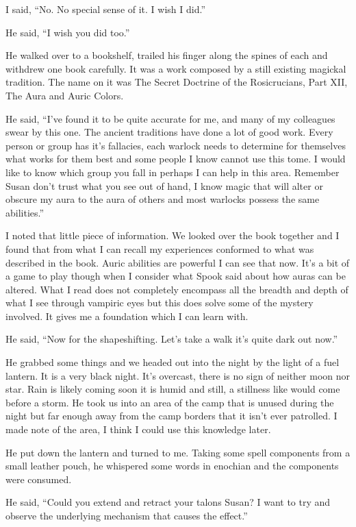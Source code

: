 I said, ``No. No special sense of it. I wish I did.''

He said, ``I wish you did too.''

He walked over to a bookshelf, trailed his finger along the spines of each and withdrew one book carefully. It was a work composed by a still existing magickal tradition. The name on it was The Secret Doctrine of the Rosicrucians, Part XII, The Aura and Auric Colors.

He said, ``I've found it to be quite accurate for me, and many of my colleagues swear by this one. The ancient traditions have done a lot of good work. Every person or group has it's fallacies, each warlock needs to determine for themselves what works for them best and some people I know cannot use this tome. I would like to know which group you fall in perhaps I can help in this area. Remember Susan don't trust what you see out of hand, I know magic that will alter or obscure my aura to the aura of others and most warlocks possess the same abilities.''

I noted that little piece of information. We looked over the book together and I found that from what I can recall my experiences conformed to what was described in the book. Auric abilities are powerful I can see that now. It's a bit of a game to play though when I consider what Spook said about how auras can be altered. What I read does not completely encompass all the breadth and depth of what I see through vampiric eyes but this does solve some of the mystery involved. It gives me a foundation which I can learn with.

He said, ``Now for the shapeshifting. Let's take a walk it's quite dark out now.''

He grabbed some things and we headed out into the night by the light of a fuel lantern. It is a very black night. It's overcast, there is no sign of neither moon nor star. Rain is likely coming soon it is humid and still, a stillness like would come before a storm. He took us into an area of the camp that is unused during the night but far enough away from the camp borders that it isn't ever patrolled. I made note of the area, I think I could use this knowledge later.

He put down the lantern and turned to me. Taking some spell components from a small leather pouch, he whispered some words in enochian and the components were consumed.

He said, ``Could you extend and retract your talons Susan? I want to try and observe the underlying mechanism that causes the effect.''

